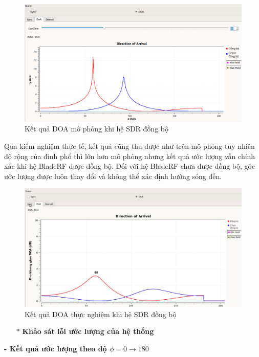 \begin{figure} [!h]
	\centering
	\includegraphics[width=1\linewidth]{figures/simukq.png}
	\caption{Kết quả DOA mô phỏng khi hệ SDR đồng bộ}
	\label{fig:simukq}
\end{figure}
\newpage
Qua kiểm nghiệm thực tế, kết quả cũng thu được như trên mô phỏng tuy nhiên độ rộng của đỉnh phổ thì lớn hơn mô phỏng nhưng kết quả ước lượng vẫn chính xác khi hệ BladeRF được đồng bộ. Đối với hệ BladeRF chưa được đồng bộ, góc ước lượng được luôn thay đổi và không thể xác định hướng sóng đến.

\begin{figure} [!h]
	\centering
	\includegraphics[width=1\linewidth]{figures/kqreal.png}
	\caption{Kết quả DOA thực nghiệm khi hệ SDR đồng bộ}
	\label{fig:kqreal}
\end{figure}
\newpage
\begin{itemize}
	\item[$\ast$] \textbf{Khảo sát lỗi ước lượng của hệ thống}
\end{itemize} 

\textbf{- Kết quả ước lượng theo độ $\phi = 0 \rightarrow 180$}

